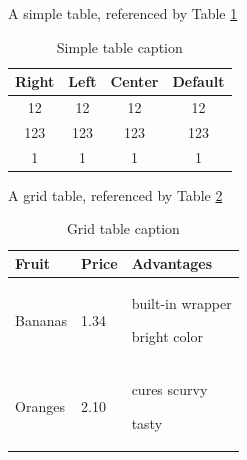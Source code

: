 \documentclass[a4paper, ]{article}
\begin{document}
    A simple table, referenced by Table \ref{tab:my-simple-table}

    \begin{table}[h]
        \caption{Simple table caption}
        \label{tab:my-simple-table}
        \centering
        \begin{tabular}{|c|c|c|c|}
            \hline
            \bfseries{Right} &
            \bfseries{Left} &
            \bfseries{Center} &
            \bfseries{Default} \\
            \hline
            12 &
            12 &
            12 &
            12 \\
            \hline
            123 &
            123 &
            123 &
            123 \\
            \hline
            1 &
            1 &
            1 &
            1 \\
            \hline
        \end{tabular}
    \end{table}

    A grid table, referenced by Table \ref{tab:my-grid-table}

    \begin{table}[h]
        \caption{Grid table caption}
        \label{tab:my-grid-table}
        \centering
        \begin{tabular}{|p{}|p{}|p{}|}
            \hline
            \bfseries{Fruit} &
            \bfseries{Price} &
            \bfseries{Advantages} \\
            \hline
            Bananas &
            1.34 &
            
    \begin{deepitemize}
        \item built-in wrapper
        \item bright color
    \end{deepitemize} \\
            \hline
            Oranges &
            2.10 &
            
    \begin{deepitemize}
        \item cures scurvy
        \item tasty
    \end{deepitemize} \\
            \hline
        \end{tabular}
    \end{table}
\end{document}
